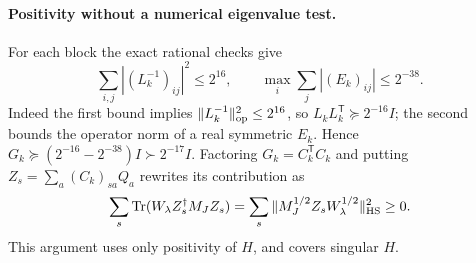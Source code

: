 \documentclass[11pt,a4paper]{article}
\begin{document}
\paragraph{Positivity without a numerical eigenvalue test.}
For each block the exact rational checks give
\[
 \sum_{i,j}|(L_k^{-1})_{ij}|^2\le2^{16},\qquad
 \max_i\sum_j|(E_k)_{ij}|\le2^{-38}.
\]
Indeed the first bound implies
$\|L_k^{-1}\|_{\rm op}^2\le2^{16}$, so
$L_kL_k^{\mathsf T}\succeq2^{-16}I$; the second bounds the operator
norm of a real symmetric $E_k$. Hence
$G_k\succeq(2^{-16}-2^{-38})I\succ2^{-17}I$.
Factoring $G_k=C_k^{\mathsf T}C_k$ and putting
$Z_s=\sum_a(C_k)_{sa}Q_a$ rewrites its contribution as
\[
 \sum_s\operatorname{Tr}(W_\lambda Z_s^\dagger M_JZ_s)
 =\sum_s\|M_J^{1/2}Z_sW_\lambda^{1/2}\|_{\rm HS}^2\ge0.
\]
This argument uses only positivity of $H$, and covers singular $H$.
\end{document}
